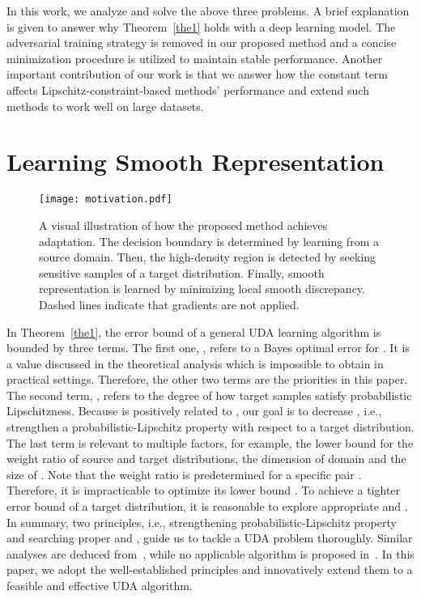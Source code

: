 \documentclass[journal,twocolumn]{IEEEtran}
\theoremstyle{definition}
\begin{document}
In this work, we analyze and solve the above three problems. A brief explanation is given to answer why Theorem~\ref{the1} holds with a deep learning model. The adversarial training strategy is removed in our proposed method and a concise minimization procedure is utilized to maintain stable performance. Another important contribution of our work is that we answer how the constant term affects Lipschitz-constraint-based methods' performance and extend such methods to work well on large datasets.

\section{Learning Smooth Representation}
\label{ourmethod}

\begin{figure*}[htp]
\centering
\texttt{[image: motivation.pdf]}
\caption{A visual illustration of how the proposed method achieves adaptation. The decision boundary is determined by learning from a source domain. Then, the high-density region is detected by seeking sensitive samples of a target distribution. Finally, smooth representation is learned by minimizing local smooth discrepancy. Dashed lines indicate that gradients are not applied.}
\label{fig:motivation}
\end{figure*} 

In Theorem~\ref{the1}, the error bound of a general UDA learning algorithm is bounded by three terms. The first one, , refers to a Bayes optimal error for . It is a value discussed in the theoretical analysis which is impossible to obtain in practical settings. Therefore, the other two terms are the priorities in this paper. The second term, , refers to the degree of how target samples satisfy  probabilistic Lipschitzness. Because  is positively related to , our goal is to decrease , i.e., strengthen a probabilistic-Lipschitz property with respect to a target distribution. The last term is relevant to multiple factors, for example, the lower bound  for the weight ratio of source and target distributions, the dimension  of domain  and the size  of . Note that the weight ratio  is predetermined for a specific pair . Therefore, it is impracticable to optimize its lower bound . To achieve a tighter error bound of a target distribution, it is reasonable to explore appropriate  and . In summary, two principles, i.e., strengthening probabilistic-Lipschitz property and searching proper  and , guide us to tackle a UDA problem thoroughly. Similar analyses are deduced from~\cite{Ben-David2014}, while no applicable algorithm is proposed in~\cite{Ben-David2014}. In this paper, we adopt the well-established principles and innovatively extend them to a feasible and effective UDA algorithm.
\end{document}
